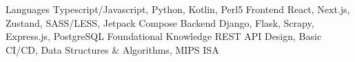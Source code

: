 
\begin{cvskills}
  \cvskill
    {Languages} %
    {Typescript/Javascript, Python, Kotlin, Perl5} %
  \cvskill
    {Frontend}
    {React, Next.js, Zustand, SASS/LESS, Jetpack Compose}
  \cvskill
    {Backend} %
    {Django, Flask, Scrapy, Express.js, PostgreSQL} %
  \cvskill
    {Foundational Knowledge}
    {REST API Design, Basic CI/CD, Data Structures \& Algorithms, MIPS ISA}
\end{cvskills}
